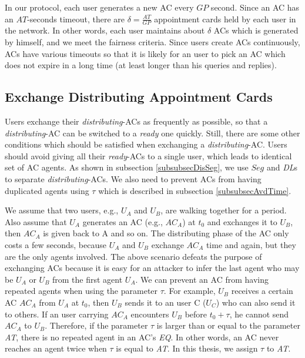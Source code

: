 In our protocol, each user generates a new AC every $GP$ second. Since an AC has an $AT$-seconds timeout, there are $\delta =\frac{AT}{GP}$ appointment cards held by each user in the network. In other words, each user maintains about $\delta$ ACs which is generated by himself, and we meet the fairness criteria. Since users create ACs continuously, ACs have various timeouts so that it is likely for an user to pick an AC which does not expire in a long time (at least longer than his queries and replies).


\subsection{Exchange Distributing Appointment Cards}\label{subsec_ExchangeDisAptCrd}

\noindent Users exchange their \textit{distributing}-ACs as frequently as possible, so that a \textit{distributing}-AC can be switched to a \textit{ready} one quickly. Still, there are some other conditions which should be satisfied when exchanging a \textit{distributing}-AC. Users should avoid giving all their \textit{ready}-ACs to a single user, which leads to identical set of AC agents. As shown in subsection \ref{subsubsecDisSeg}, we use $Seg$ and \textit{DL}s to separate \textit{distributing}-ACs. We also need to prevent ACs from having duplicated agents using $\tau$ which is described in subsection \ref{subsubsecAvdTime}.

We assume that two users, e.g., $U_A$ and $U_B$, are walking together for a period. Also assume that $U_A$ generates an AC (e.g., ${AC}_A$) at $t_0$ and exchanges it to $U_B$, then ${AC}_A$ is given back to A and so on. The distributing phase of the AC only costs a few seconds, because $U_A$ and $U_B$ exchange ${AC}_A$ time and again, but they are the only agents involved. The above scenario defeats the purpose of exchanging ACs because it is easy for an attacker to infer the last agent who may be $U_A$ or $U_B$ from the first agent $U_A$. We can prevent an AC from having repeated agents when using the parameter $\tau$. For example, $U_B$ receives a certain AC ${AC}_A$ from $U_A$ at $t_0$, then $U_B$ sends it to an user C ($U_C$) who can also send it to others. If an user carrying ${AC}_A$ encounters $U_B$ before $t_0+\tau $, he cannot send ${AC}_A$ to $U_B$. Therefore, if the parameter $\tau $ is larger than or equal to the parameter \textit{AT}, there is no repeated agent in an AC's \textit{EQ}. In other words, an AC never reaches an agent twice when $\tau $ is equal to \textit{AT}. In this thesis, we assign $\tau $ to \textit{AT}. 

